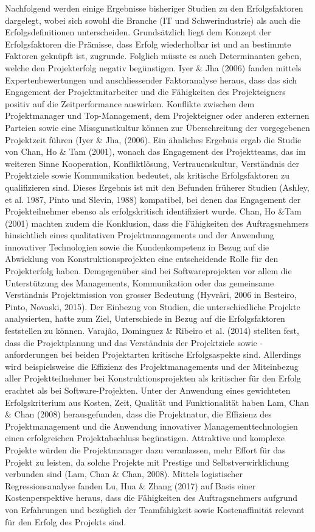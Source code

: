 Nachfolgend werden einige Ergebnisse bisheriger Studien zu den Erfolgsfaktoren dargelegt, wobei sich sowohl die Branche (IT und Schwerindustrie) als auch die Erfolgsdefinitionen unterscheiden. Grundsätzlich liegt dem Konzept der Erfolgsfaktoren die Prämisse, dass Erfolg wiederholbar ist und an bestimmte Faktoren geknüpft ist, zugrunde. Folglich müsste es auch Determinanten geben, welche den Projekterfolg negativ begünstigen. Iyer \& Jha (2006) fanden mittels Expertenbewertungen und anschliessender Faktoranalyse heraus, dass das sich Engagement der Projektmitarbeiter und die Fähigkeiten des Projekteigners positiv auf die Zeitperformance auswirken. Konflikte zwischen dem Projektmanager und Top-Management, dem Projekteigner oder anderen externen Parteien sowie eine Missgunstkultur können zur Überschreitung der vorgegebenen Projektzeit führen (Iyer \& Jha, (2006). Ein ähnliches Ergebnis ergab die Studie von Chan, Ho \& Tam (2001), wonach das Engagement des Projektteams, das im weiteren Sinne Kooperation, Konfliktlösung, Vertrauenskultur, Verständnis der Projektziele sowie Kommunikation bedeutet, als kritische Erfolgsfaktoren zu qualifizieren sind. Dieses Ergebnis ist mit den Befunden früherer Studien (Ashley, et al. 1987, Pinto und Slevin, 1988) kompatibel, bei denen das Engagement der Projekteilnehmer ebenso als erfolgskritisch identifiziert wurde. Chan, Ho \&Tam (2001) machten zudem die Konklusion, dass die Fähigkeiten des Auftragsnehmers hinsichtlich eines qualitativen Projektmanagements und der Anwendung innovativer Technologien sowie die Kundenkompetenz in Bezug auf die Abwicklung von Konstruktionsprojekten eine entscheidende Rolle für den Projekterfolg haben. Demgegenüber sind bei Softwareprojekten vor allem die Unterstützung des Managements, Kommunikation oder das gemeinsame Verständnis Projektmission von grosser Bedeutung (Hyvräri, 2006 in Besteiro, Pinto, Novaski, 2015). Der Einbezug von Studien, die unterschiedliche Projekte analysierten, hatte zum Ziel, Unterschiede in Bezug auf die Erfolgsfaktoren feststellen zu können. Varajão, Dominguez \& Ribeiro et al. (2014) stellten fest, dass die Projektplanung und das Verständnis der Projektziele sowie -anforderungen bei beiden Projektarten kritische Erfolgsaspekte sind. Allerdings wird beispielsweise die Effizienz des Projektmanagements und der Miteinbezug aller Projektteilnehmer bei Konstruktionsprojekten als kritischer für den Erfolg erachtet als bei Software-Projekten. Unter der Anwendung eines gewichteten Erfolgskriterium aus Kosten, Zeit, Qualität und Funktionalität haben Lam, Chan \& Chan (2008) herausgefunden, dass die Projektnatur, die Effizienz des Projektmanagement und die Anwendung innovativer Managementtechnologien einen erfolgreichen Projektabschluss begünstigen. Attraktive und komplexe Projekte würden die Projektmanager dazu veranlassen, mehr Effort für das Projekt zu leisten, da solche Projekte mit Prestige und Selbstverwirklichung verbunden sind (Lam, Chan \& Chan, 2008). Mittels logistischer Regressionsanalyse fanden Lu, Hua \& Zhang (2017) auf Basis einer Kostenperspektive heraus, dass die Fähigkeiten des Auftragsnehmers aufgrund von Erfahrungen und bezüglich der Teamfähigkeit sowie Kostenaffinität relevant für den Erfolg des Projekts sind. 
